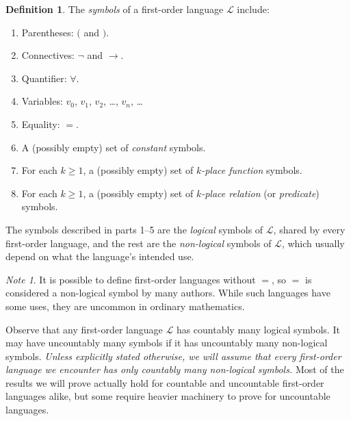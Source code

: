 \documentclass[12pt]{amsbook}
\theoremstyle{plain}
\theoremstyle{definition}
\newtheorem{defn}{Definition}[chapter]
\theoremstyle{remark}
\newtheorem*{note}{Note}             %
\begin{document}
\begin{defn} \label{d:sym}   
The {\em symbols\/} of a first-order language $\mathcal{L}$ include:
\begin{enumerate}
\item Parentheses:  $($ and $)$.  \index{$($} \index{$)$}
\item Connectives:  $\lnot$ and $\to$.  \index{$\lnot$} \index{$\to$}
\item Quantifier:  $\forall$.  \index{$\forall$}
\item Variables:  $v_0$,  $v_1$,  $v_2$,  \dots,  $v_n$,  \dots {} 
\item Equality:  $=$.  \index{$=$}
\item A (possibly empty) set of {\em constant\/} symbols. 
\item For each $k \ge 1$,  a (possibly empty) set of {\em $k$-place function\/} symbols.  
\item For each $k \ge 1$,  a (possibly empty) set of {\em $k$-place relation\/} (or {\em predicate\/}) symbols.   
\end{enumerate}
The symbols described in parts 1--5 are the {\em logical\/} symbols of $\mathcal{L}$,  shared by every first-order language,  and the rest are the {\em non-logical\/} symbols of $\mathcal{L}$,  which usually depend on what the language's intended use. 
\end{defn}

\begin{note}
It is possible to define first-order languages without $=$,  so $=$ is considered a non-logical symbol by many authors.  While such languages have some uses,  they are uncommon in ordinary mathematics.

Observe that any first-order language $\mathcal{L}$ has countably many logical symbols.  It may have uncountably many symbols if it has uncountably many non-logical symbols.  {\em Unless explicitly stated otherwise,  we will assume that every first-order language we encounter has only countably many non-logical symbols.\/}  Most of the results we will prove actually hold for countable and uncountable first-order languages alike,  but some require heavier machinery to prove for uncountable languages.
\end{note}
\end{document}
